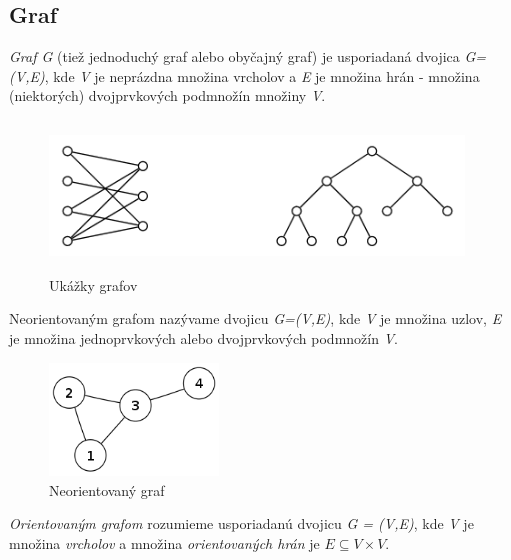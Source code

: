 \documentclass[slovak,master,public,dept460,male,cpdeclaration,oneside]{diploma}
\begin{document}
\subsection{Graf}

\begin{definition}
\textit{Graf G} (tiež jednoduchý graf alebo obyčajný graf) je usporiadaná dvojica \textit{G=(V,E)}, kde \textit{V} je neprázdna množina vrcholov a \textit{E} je množina hrán - množina (niektorých) dvojprvkových podmnožín množiny \textit{V}.  \cite{kovavr2012uvod}
\label{ukazkygrafov}
\end{definition}


\begin{figure}[H]
\centering
\includegraphics[width=11cm,height=4cm]{figures/ukazkygrafov}
\caption{Ukážky grafov}
\end{figure}


\begin{definition}
Neorientovaným grafom nazývame dvojicu \textit{G=(V,E)}, kde \textit{V} je množina uzlov, \textit{E} je množina jednoprvkových alebo dvojprvkových podmnožín \textit{V}. \cite{demel2002grafy}
\end{definition}

\begin{figure}[H]
\centering
\includegraphics[width=4.5cm,height=3cm]{figures/neorientovany}
\caption{Neorientovaný graf}
\end{figure}


\begin{definition}
\textit{Orientovaným grafom} rozumieme usporiadanú dvojicu \textit{G = (V,E)}, kde \textit{V} je množina \textit{vrcholov} a množina \textit{orientovaných hrán} je $E \subseteq  V \times V$.  \cite{kovavr2012uvod}
\end{definition}
\end{document}
